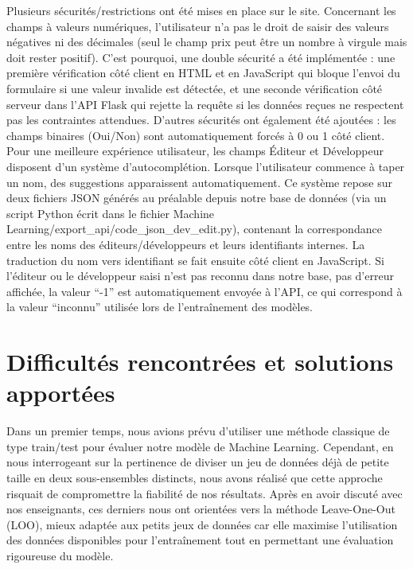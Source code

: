 \documentclass[mstat,12pt]{unswthesis}
\begin{document}
Plusieurs sécurités/restrictions ont été mises en place sur le site. Concernant les champs à valeurs numériques, l'utilisateur n’a pas le droit de saisir des valeurs négatives ni des décimales (seul le champ prix peut être un nombre à virgule mais doit rester positif). C’est pourquoi, une double sécurité a été implémentée : une première vérification côté client en HTML et en JavaScript qui bloque l'envoi du formulaire si une valeur invalide est détectée, et une seconde vérification côté serveur dans l'API Flask qui rejette la requête si les données reçues ne respectent pas les contraintes attendues. D'autres sécurités ont également été ajoutées : les champs binaires (Oui/Non) sont automatiquement forcés à 0 ou 1 côté client. Pour une meilleure expérience utilisateur, les champs Éditeur et Développeur disposent d'un système d'autocomplétion. Lorsque l'utilisateur commence à taper un nom, des suggestions apparaissent automatiquement. Ce système repose sur deux fichiers JSON générés au préalable depuis notre base de données (via un script Python écrit dans le fichier Machine Learning/export\_api/code\_json\_dev\_edit.py), contenant la correspondance entre les noms des éditeurs/développeurs et leurs identifiants internes. La traduction du nom vers identifiant se fait ensuite côté client en JavaScript. Si l'éditeur ou le développeur saisi n'est pas reconnu dans notre base, pas d’erreur affichée, la valeur “-1” est automatiquement envoyée à l'API, ce qui correspond à la valeur “inconnu” utilisée lors de l'entraînement des modèles.




\hypertarget{DifficultésRencontréesEtSolutionsApportées}{%
\section{\textbf{Difficultés rencontrées et solutions apportées}}\label{DifficultésRencontréesEtSolutionsApportées}}

Dans un premier temps, nous avions prévu d'utiliser une méthode classique de type train/test pour évaluer notre modèle de Machine Learning. Cependant, en nous interrogeant sur la pertinence de diviser un jeu de données déjà de petite taille en deux sous-ensembles distincts, nous avons réalisé que cette approche risquait de compromettre la fiabilité de nos résultats. Après en avoir discuté avec nos enseignants, ces derniers nous ont orientées vers la méthode Leave-One-Out (LOO), mieux adaptée aux petits jeux de données car elle maximise l'utilisation des données disponibles pour l'entraînement tout en permettant une évaluation rigoureuse du modèle. 
\end{document}
